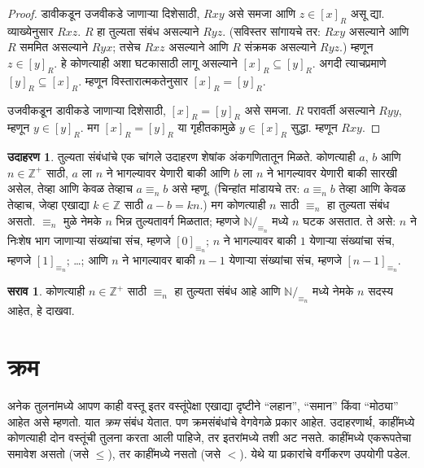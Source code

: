 \documentclass[11pt,a4paper,openany]{book}
\theoremstyle{definition}
\newtheorem{ex}[defn]{उदाहरण}
\newtheorem{prob}{सराव}[chapter]
\newenvironment{explain}{}{}
\newcommand{\Nat}{\mathbb{N}}
\newcommand{\Int}{\mathbb{Z}}
\newcommand{\PosInt}{\mathbb{Z}^{+}}
\newcommand{\equivrep}[2]{[#1]_{#2}}
\newcommand{\equivclass}[2]{#1/_{\!{#2}}}
\begin{document}
\begin{proof}
डावीकडून उजवीकडे जाणाऱ्या दिशेसाठी, $Rxy$ असे समजा आणि
$z \in \equivrep{x}{R}$ असू द्या. व्याख्येनुसार $Rxz$. $R$ हा तुल्यता
संबंध असल्याने $Ryz$. (सविस्तर सांगायचे तर: $Rxy$ असल्याने आणि $R$
सममित असल्याने $Ryx$; तसेच $Rxz$ असल्याने आणि $R$ संक्रमक असल्याने
$Ryz$.) म्हणून $z \in \equivrep{y}{R}$. हे कोणत्याही अशा घटकासाठी
लागू असल्याने $\equivrep{x}{R} \subseteq \equivrep{y}{R}$. अगदी
त्याचप्रमाणे $\equivrep{y}{R} \subseteq \equivrep{x}{R}$. म्हणून
विस्तारात्मकतेनुसार $\equivrep{x}{R} = \equivrep{y}{R}$.

उजवीकडून डावीकडे जाणाऱ्या दिशेसाठी,
$\equivrep{x}{R} = \equivrep{y}{R}$ असे समजा. $R$ परावर्ती असल्याने
$Ryy$, म्हणून $y \in \equivrep{y}{R}$. मग
$\equivrep{x}{R} = \equivrep{y}{R}$ या गृहीतकामुळे
$y \in \equivrep{x}{R}$ सुद्धा. म्हणून $Rxy$.
\end{proof}

\begin{ex}
तुल्यता संबंधांचे एक चांगले उदाहरण शेषांक अंकगणितातून मिळते. कोणत्याही
$a$, $b$ आणि $n \in \PosInt$ साठी, $a$ ला $n$ ने भागल्यावर येणारी
बाकी आणि $b$ ला $n$ ने भागल्यावर येणारी बाकी सारखी असेल, तेव्हा आणि
केवळ तेव्हाच $a \equiv_n b$ असे म्हणू. (चिन्हांत मांडायचे तर:
$a \equiv_n b$ तेव्हा आणि केवळ तेव्हाच, जेव्हा एखाद्या $k \in \Int$
साठी $a - b = kn$.) मग कोणत्याही $n$ साठी $\equiv_n$ हा तुल्यता
संबंध असतो. $\equiv_n$ मुळे नेमके $n$ भिन्न तुल्यतावर्ग मिळतात; म्हणजे
$\equivclass{\Nat}{\equiv_n}$ मध्ये $n$ घटक असतात. ते असे:
$n$ ने निःशेष भाग जाणाऱ्या संख्यांचा संच, म्हणजे $\equivrep{0}{\equiv_n}$;
$n$ ने भागल्यावर बाकी $1$ येणाऱ्या संख्यांचा संच, म्हणजे
$\equivrep{1}{\equiv_n}$; \ldots; आणि $n$ ने भागल्यावर बाकी $n-1$
येणाऱ्या संख्यांचा संच, म्हणजे $\equivrep{n-1}{\equiv_n}$.
\end{ex}

\begin{prob}
कोणत्याही $n \in \PosInt$ साठी $\equiv_n$ हा तुल्यता संबंध आहे आणि
$\equivclass{\Nat}{\equiv_n}$ मध्ये नेमके $n$ सदस्य आहेत, हे दाखवा.
\end{prob}











\section{क्रम}\label{sfr:rel:ord:sec}

\begin{explain}
अनेक तुलनांमध्ये आपण काही वस्तू इतर वस्तूंपेक्षा एखाद्या दृष्टीने
``लहान'', ``समान'' किंवा ``मोठ्या'' आहेत असे म्हणतो. यात \emph{क्रम}
संबंध येतात. पण क्रमसंबंधांचे वेगवेगळे प्रकार आहेत. उदाहरणार्थ, काहींमध्ये
कोणत्याही दोन वस्तूंची तुलना करता आली पाहिजे, तर इतरांमध्ये तशी अट नसते.
काहींमध्ये एकरूपतेचा समावेश असतो (जसे $\le$), तर काहींमध्ये नसतो
(जसे $<$). येथे या प्रकारांचे वर्गीकरण उपयोगी पडेल.
\end{explain}
\end{document}
